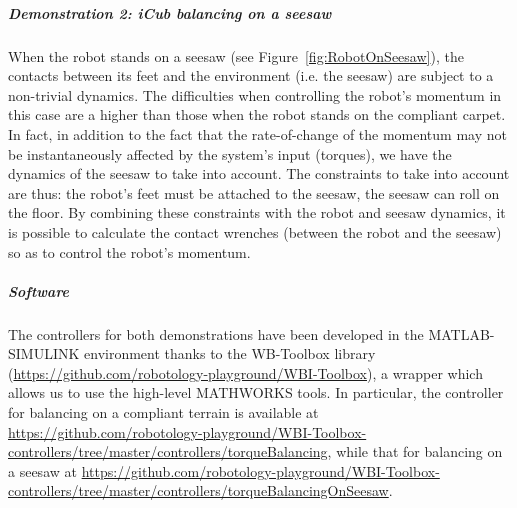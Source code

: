 \subparagraph{Demonstration 2: iCub balancing on a seesaw}
When the robot stands on a seesaw (see Figure~\ref{fig:RobotOnSeesaw}), the contacts between its feet and the environment (i.e. the seesaw) are subject to a non-trivial dynamics.
 The difficulties when controlling the robot's momentum in this case are a higher than those when the robot stands on the compliant carpet. In fact, in addition to the fact that  the rate-of-change of the momentum may not be instantaneously affected by the system's input (torques), we have the dynamics of the seesaw to take into account. The constraints to take into account are thus: the robot's feet must be attached to the seesaw, the seesaw can roll on the floor. By combining these constraints with the robot and seesaw dynamics, it is possible to calculate the contact wrenches (between the robot and the seesaw) so as to control the robot's momentum.
 
\begin{figure}[t!]
\end{figure}

\subparagraph{Software}
The controllers for both demonstrations have been developed in the MATLAB-SIMULINK environment thanks to the WB-Toolbox library (\url{https://github.com/robotology-playground/WBI-Toolbox}), a wrapper which allows us to use the high-level MATHWORKS tools. In particular, the controller for balancing on a compliant terrain is available at \url{https://github.com/robotology-playground/WBI-Toolbox-controllers/tree/master/controllers/torqueBalancing}, while that for balancing on a seesaw at 
\url{https://github.com/robotology-playground/WBI-Toolbox-controllers/tree/master/controllers/torqueBalancingOnSeesaw}.

